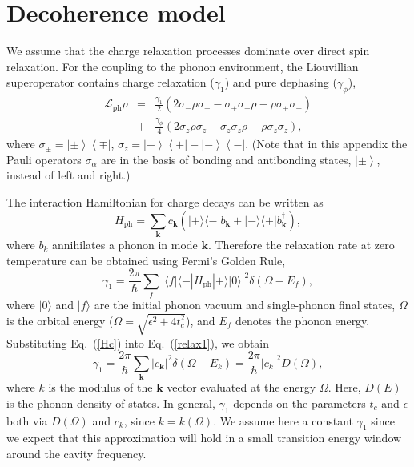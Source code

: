 \documentclass[twocolumn,english,aps,prl,preprint,reprint,showpacs,longbibliography,showkeys]{revtex4-1}
\begin{document}
\section{Decoherence model\label{sec:decoherence}}

We assume that the charge relaxation processes dominate over
direct spin relaxation.  
For the coupling to the phonon environment, the  Liouvillian superoperator   contains charge relaxation ($\gamma_{1}$) and pure dephasing ($\gamma_{\phi}$),
\begin{eqnarray}
\mathcal{L}_{\text{ph}}\rho&=&\frac{\gamma_1}{2}\left(2\sigma_-\rho\sigma_+-\sigma_+\sigma_-\rho-\rho\sigma_+\sigma_-\right) \nonumber\\
&+&\frac{\gamma_{\phi}}{4}\left(2\sigma_z\rho\sigma_z-\sigma_z\sigma_z\rho-\rho\sigma_z\sigma_z\right)
, \label{eq:decoherence}
\end{eqnarray}
where $\sigma_{\pm}=\left|\pm\right\rangle\left\langle \mp\right|$, $\sigma_z=\left|+\right\rangle\left\langle+\right|-\left|-\right\rangle\left\langle-\right|$. (Note that in this appendix the Pauli operators $\sigma_{\alpha}$ are in the basis of bonding and antibonding states, $\left|\pm\right\rangle$, instead of left and right.)


The interaction Hamiltonian for charge
decays can be written as 
\begin{equation}
H_{\mathrm{ph}} =  \sum_{\mathbf{k}} c_{\mathbf{k}} \left(|+\rangle\langle -| b_{\mathbf{k}} +|-\rangle\langle +|b_{\mathbf{k}}^\dagger \right),
\label{Hc}
\end{equation}
where $b_k$ annihilates a phonon in mode ${\mathbf{k}}$.
Therefore the relaxation rate at zero temperature can be obtained 
using Fermi's Golden Rule,
\begin{equation}
\gamma_{1} = \frac{2\pi}{\hbar}  \sum_f |\langle f| \langle -| H_{\mathrm{ph}}|+\rangle |0\rangle|^2 \delta(\Omega-E_f),
\label{relax1}
\end{equation}
where $|0\rangle$ and $|f\rangle$ are the initial phonon vacuum and single-phonon final states,  $\Omega$ is the orbital energy ($\Omega=\sqrt{\epsilon^2+4 t_c^2}$), and $E_f$ denotes the phonon energy.
Substituting Eq.~(\ref{Hc}) into Eq.~(\ref{relax1}), we obtain
\begin{equation}
\gamma_{1}  = \frac{2\pi}{\hbar}  \sum_{\mathbf{k}} |c_{\mathbf{k}}|^2 \delta(\Omega-E_{k})
 = \frac{2\pi}{\hbar}  |c_{k}|^2 D(\Omega),
\end{equation}
where $k$ is the modulus of the ${\mathbf{k}}$ vector evaluated at the energy $\Omega$.
Here, $D(E)$ is the phonon density of states.
In general, $\gamma_1$ depends on the parameters $t_c$ and $\epsilon$ both via $D(\Omega)$ and $c_k$, since $k=k(\Omega)$. We assume here a constant $\gamma_1$ since we expect that this approximation will hold in a small transition
energy window around the cavity frequency.
\end{document}

